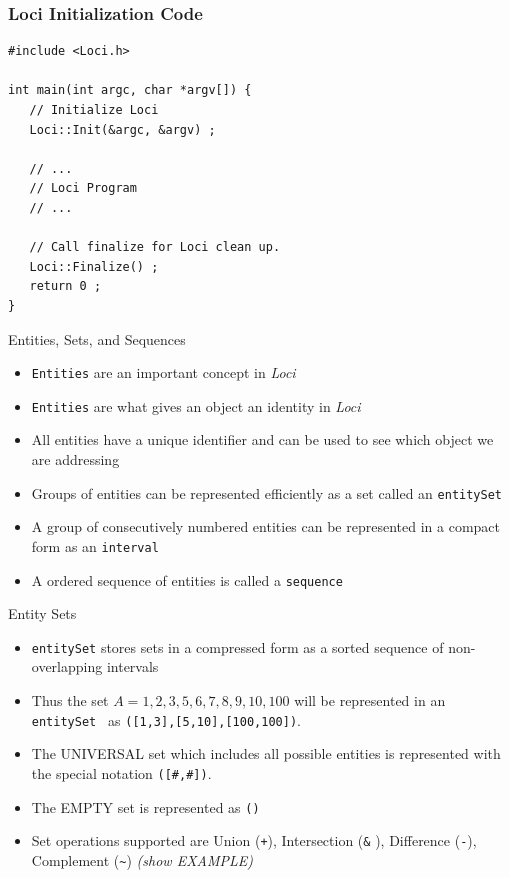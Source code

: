 \documentclass{beamer}
\begin{document}
\begin{frame}[fragile=singleslide]\frametitle{Loci Initialization Code}
\begin{verbatim}
#include <Loci.h>

int main(int argc, char *argv[]) {
   // Initialize Loci
   Loci::Init(&argc, &argv) ;

   // ...
   // Loci Program
   // ...

   // Call finalize for Loci clean up.
   Loci::Finalize() ;
   return 0 ;
}
\end{verbatim}
\end{frame}

\begin{frame}{Entities, Sets, and Sequences}
\begin{itemize}
\item {\tt Entities} are an important concept in {\it Loci}
\item {\tt Entities} are what gives an object an identity in {\it Loci}
\item All entities have a unique identifier and can be used to see which object we are addressing
\item Groups of entities can be represented efficiently as a set called an {\tt entitySet}
\item A group of consecutively numbered entities can be represented in a compact form as an {\tt interval}
\item A ordered sequence of entities is called a {\tt sequence}
\end{itemize}
\end{frame}

\begin{frame}{Entity Sets}
\begin{itemize}
 \item {\tt entitySet} stores sets in a compressed form as a sorted sequence of non-overlapping intervals
 \item Thus the set $A={1,2,3,5,6,7,8,9,10,100}$ will be represented in an {\tt entitySet } as {\tt ([1,3],[5,10],[100,100])}.
 \item The UNIVERSAL set which includes all possible entities is represented with the special notation {\tt ([\#,\#])}.
 \item The EMPTY set is represented as {\tt ()}
 \item Set operations supported are Union ({\tt +}), Intersection ({\tt \&} ), Difference ({\tt -}), Complement ({\tt \textasciitilde}) {\it (show EXAMPLE)}
\end{itemize}
\end{frame}
\end{document}
